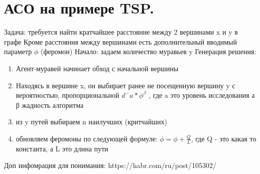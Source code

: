 \section{АСО на примере TSP.}
Задача: требуется найти кратчайшее расстояние между 2 вершинами x и y в графе
Кроме расстояния между вершинами есть дополнительный вводимый параметр $\phi$ (феромон)
Начало: задаем количество муравьев y 
Генерация решения:
\begin{enumerate} 
	\item Агент-муравей начинает обход с начальной вершины
	\item Находясь в вершине x, он выбирает ранее не посещенную вершину y с вероятностью, пропорциональной $d^-a * \phi^β$ , где a это уровень исследования а β жадность алгоритма
	\item из y путей выбираем n наилучших (критчайших)
	\item обновляем феромоны по следующей формуле: $\phi = \phi +  \frac{Q}{L}$, где Q - это какая то константа, а L это длина пути
\end{enumerate}
Доп инфомрация для понимания: https://habr.com/ru/post/105302/

